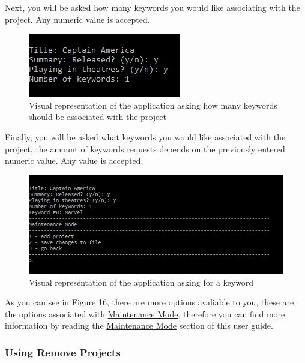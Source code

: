 \documentclass[
  english,
  a4paper,
,tablecaptionabove
]{scrartcl}
\begin{document}
Next, you will be asked how many keywords you would like associating
with the project. Any numeric value is accepted.

\begin{figure}
\centering
\includegraphics{images/user-guide/maintenance-mode/add-project-keywords-amount.png}
\caption{Visual representation of the application asking how many
keywords should be associated with the project}
\end{figure}

Finally, you will be asked what keywords you would like associated with
the project, the amount of keywords requests depends on the previously
entered numeric value. Any value is accepted.

\begin{figure}
\centering
\includegraphics{images/user-guide/maintenance-mode/add-project-keywords.png}
\caption{Visual representation of the application asking for a keyword}
\end{figure}

As you can see in Figure 16, there are more options avaliable to you,
these are the options associated with
\protect\hyperlink{using-maintenance-mode}{Maintenance Mode}, therefore
you can find more information by reading the
\protect\hyperlink{using-maintenance-mode}{Maintenance Mode} section of
this user guide.

\newpage

\hypertarget{using-remove-projects}{%
\subsubsection{Using Remove Projects}\label{using-remove-projects}}
\end{document}
